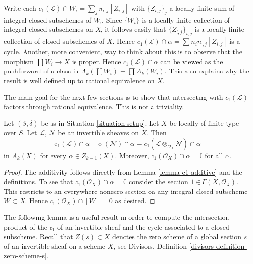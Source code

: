 \noindent
Write each $c_1(\mathcal{L}) \cap W_i = \sum_j n_{i, j} [Z_{i, j}]$
with $\{Z_{i, j}\}_j$ a locally finite sum
of integral closed subschemes of $W_i$. Since $\{W_i\}$ is a locally
finite collection of integral closed subschemes on $X$, it follows
easily that $\{Z_{i, j}\}_{i, j}$ is a locally finite collection
of closed subschemes of $X$. Hence
$c_1(\mathcal{L}) \cap \alpha = \sum n_in_{i, j}[Z_{i, j}]$
is a cycle. Another, more convenient, way to think about this
is to observe that the morphism $\coprod W_i \to X$ is
proper. Hence $c_1(\mathcal{L}) \cap \alpha$ can be viewed
as the pushforward of a class in $A_k(\coprod W_i) = \prod A_k(W_i)$.
This also explains why the result is well defined up to rational
equivalence on $X$.

\medskip\noindent
The main goal for the next few sections is to show that intersecting with
$c_1(\mathcal{L})$ factors through rational equivalence.
This is not a triviality.

\begin{lemma}
\label{lemma-c1-cap-additive}
Let $(S, \delta)$ be as in Situation \ref{situation-setup}.
Let $X$ be locally of finite type over $S$.
Let $\mathcal{L}$, $\mathcal{N}$ be an invertible sheaves on $X$.
Then
$$
c_1(\mathcal{L}) \cap \alpha  + c_1(\mathcal{N}) \cap \alpha =
c_1(\mathcal{L} \otimes_{\mathcal{O}_X} \mathcal{N}) \cap \alpha
$$
in $A_k(X)$ for every $\alpha \in Z_{k - 1}(X)$. Moreover,
$c_1(\mathcal{O}_X) \cap \alpha = 0$ for all $\alpha$.
\end{lemma}

\begin{proof}
The additivity follows directly from Lemma \ref{lemma-c1-additive}
and the definitions. To see that $c_1(\mathcal{O}_X) \cap \alpha = 0$
consider the section $1 \in \Gamma(X, \mathcal{O}_X)$. This restricts
to an everywhere nonzero section on any integral closed subscheme
$W \subset X$. Hence $c_1(\mathcal{O}_X) \cap [W] = 0$ as desired.
\end{proof}

\noindent
The following lemma is a useful result in order to compute the intersection
product of the $c_1$ of an invertible sheaf and the cycle associated
to a closed subscheme.
Recall that $Z(s) \subset X$ denotes the zero scheme of a global section
$s$ of an invertible sheaf on a scheme $X$, see
Divisors, Definition \ref{divisors-definition-zero-scheme-s}.

